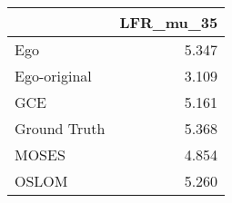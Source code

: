 \begin{tabular}{lr}
\toprule
{} & LFR_mu_35 \\
\midrule
Ego          &     5.347 \\
Ego-original &     3.109 \\
GCE          &     5.161 \\
Ground Truth &     5.368 \\
MOSES        &     4.854 \\
OSLOM        &     5.260 \\
\bottomrule
\end{tabular}
